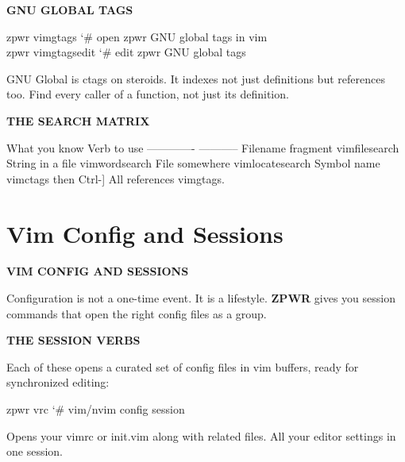 \documentclass[11pt,a4paper,twoside]{book}
\begin{document}
\vspace{12pt}
{\bfseries\color{neonyellow} GNU GLOBAL TAGS}\vspace{4pt}

\begin{codebox}
\color{neongreen}zpwr vimgtags               {\char`\#} open zpwr GNU global tags in vim\\
\color{neongreen}zpwr vimgtagsedit           {\char`\#} edit zpwr GNU global tags\\
\end{codebox}

GNU Global is ctags on steroids. It indexes not just definitions but references too. Find every caller of a function, not just its definition.


\vspace{12pt}
{\bfseries\color{neonyellow} THE SEARCH MATRIX}\vspace{4pt}

What you know       Verb to use -------------       ----------- Filename fragment   vimfilesearch String in a file    vimwordsearch File somewhere      vimlocatesearch Symbol name         vimctags then Ctrl-] All references      vimgtags.


\vspace{16pt}

\section{Vim Config and Sessions}


\vspace{10pt}
{\large\bfseries\color{neoncyan} VIM CONFIG AND SESSIONS}\vspace{6pt}

Configuration is not a one-time event. It is a lifestyle. \textbf{ZPWR} gives you session commands that open the right config files as a group.


\vspace{12pt}
{\bfseries\color{neonyellow} THE SESSION VERBS}\vspace{4pt}

Each of these opens a curated set of config files in vim buffers, ready for synchronized editing:

\begin{codebox}
\color{neongreen}zpwr vrc          {\char`\#} vim/nvim config session\\
\end{codebox}

Opens your vimrc or init.vim along with related files. All your editor settings in one session.
\end{document}
